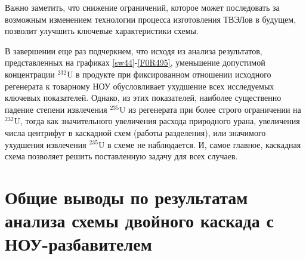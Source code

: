 Важно заметить, что снижение ограничений, которое может последовать за возможным изменением технологии процесса изготовления ТВЭЛов в будущем, позволит улучшить ключевые характеристики схемы.

В завершении еще раз подчеркнем, что исходя из анализа результатов, представленных на графиках \ref{sw44}-\ref{F0R495}, уменьшение допустимой концентрации $^{232}$U в продукте при фиксированном отношении исходного регенерата к товарному НОУ обусловливает ухудшение всех исследуемых ключевых показателей. Однако, из этих показателей, наиболее существенно падение степени извлечения $^{235}$U из регенерата при более строго ограничении на $^{232}$U, тогда как значительного увеличения расхода природного урана, увеличения числа центрифуг в каскадной схем (работы разделения), или значимого ухудшения извлечения $^{235}$U в схеме не наблюдается. И, самое главное, каскадная схема позволяет решить поставленную задачу для всех случаев.


\section{Общие выводы по результатам анализа схемы двойного каскада с НОУ-разбавителем}

